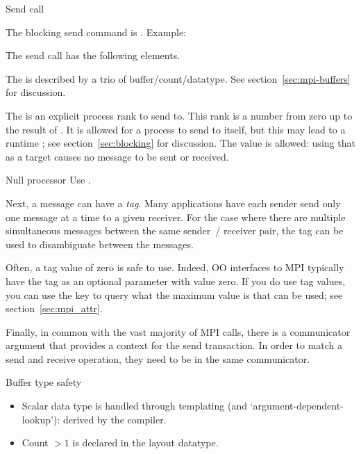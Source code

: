  {Send call}

The blocking send command is
%
.
%
Example:

The send call has the following elements.

The  is described by a trio of buffer/count/datatype.
See section~\ref{sec:mpi-buffers} for discussion.

The   is an
explicit process rank to send to.  This rank is a number from zero up
to the result of .
It is allowed for a process to send to itself, but
this may lead to a runtime ;
see section~\ref{sec:blocking} for discussion.
The value  is allowed:
using that as a target causes no message to be sent
or received.

\begin{mplnote}{Null processor}
  Use .
\end{mplnote}

Next, a message can have a
\emph{tag}.
Many applications have each sender send only one message at a time
to a given receiver.
For the case where there are
multiple simultaneous messages between the same sender~/ receiver pair,
the tag can be used to disambiguate between
the messages.

Often, a tag value of zero is safe to use.
Indeed, \ac{OO} interfaces to MPI typically have  the tag
as an optional parameter with value zero.
If you do
use tag values, you can use the key  to query
what the maximum value is that can be used; see
section~\ref{sec:mpi_attr}.

Finally, in common with the vast majority of MPI calls,
there is a communicator argument that provides a context for the send transaction.
In order to match a send and receive operation,
they need to be in the same communicator.

\begin{mplnote}{Buffer type safety}
  \begin{itemize}
  \item Scalar data type is handled through templating
    (and `argument-dependent-lookup'): derived by the compiler.
  \item Count $>1$ is declared in the layout datatype.
  \end{itemize}
\end{mplnote}

